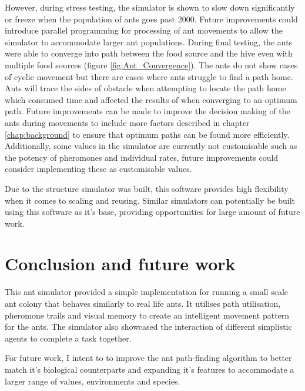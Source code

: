 \documentclass[a4paper, oneside, 11pt]{report}
\begin{document}
However, during stress testing, the simulator is shown to slow down significantly or freeze when the population of ants goes past 2000. Future improvements could introduce parallel programming for processing of ant movements to allow the simulator to accommodate larger ant populations. During final testing, the ants were able to converge into path between the food source and the hive even with multiple food sources (figure \ref{fig:Ant_Convergence}). The ants do not show cases of cyclic movement but there are cases where ants struggle to find a path home. Ants will trace the sides of obstacle when attempting to locate the path home which consumed time and affected the results of when converging to an optimum path. Future improvements can be made to improve the decision making of the ants during movements to include more factors described in chapter \ref{chap:background} to ensure that optimum paths can be found more efficiently. Additionally, some values in the simulator are currently not customisable such as the potency of pheromones and individual rates, future improvements could consider implementing these as customisable values.

Due to the structure simulator was built, this software provides high flexibility when it comes to scaling and reusing. Similar simulators can potentially be built using this software as it's base, providing opportunities for large amount of future work.

\chapter{Conclusion and future work}
\label{chap:conclusion}
This ant simulator provided a simple implementation for running a small scale ant colony that behaves similarly to real life ants. It utilises path utilisation, pheromone trails and visual memory to create an intelligent movement pattern for the ants. The simulator also showcased the interaction of different simplistic agents to complete a task together.

For future work, I intent to to improve the ant path-finding algorithm to better match it's biological counterparts and expanding it's features to accommodate a larger range of values, environments and species.




\end{document}
